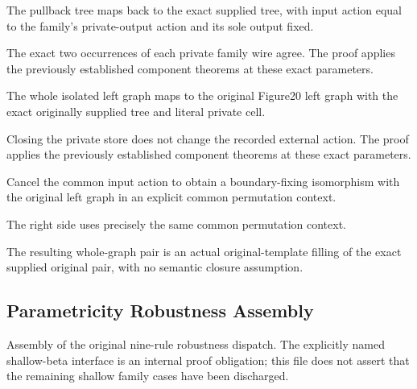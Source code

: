 The pullback tree maps back to the exact supplied tree, with input action
equal to the family's private-output action and its sole output fixed.
\par{}

The exact two occurrences of each private family wire agree.
The proof applies the previously established component theorems at these exact parameters.
\par{}

The whole isolated left graph maps to the original Figure20 left graph
with the exact originally supplied tree and literal private cell.
\par{}

Closing the private store does not change the recorded external action.
The proof applies the previously established component theorems at these exact parameters.
\par{}

Cancel the common input action to obtain a boundary-fixing isomorphism
with the original left graph in an explicit common permutation context.
\par{}

The right side uses precisely the same common permutation context.
\par{}

The resulting whole-graph pair is an actual original-template filling
of the exact supplied original pair, with no semantic closure assumption.
\par{}

\subsection{Parametricity Robustness Assembly}
Assembly of the original nine-rule robustness dispatch. The explicitly
named shallow-beta interface is an internal proof obligation; this file does
not assert that the remaining shallow family cases have been discharged.

